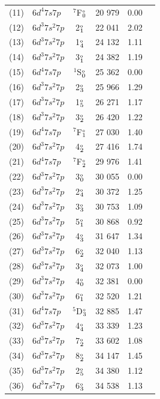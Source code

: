 \documentclass[10pt,a4paper, twoside]{report}
\begin{document}
\begin{table}[t]
\begin{tabular}{cl@{\hspace{0.5cm}}c@{\hspace{0.5cm}}r@{\hspace{0.5cm}}r@{\hspace{1cm}}l}
(11) &  $6d^4 7s 7p$  &  $^7$F$_0^{\rm_o}$   & 20 979 & 0.00  \\  
(12) &  $6d^3 7s^2 7p$  & 2$_1^{\rm_o}$     & 22 041 & 2.02   \\  
 (13) &  $6d^3 7s^2 7p$  &  1$_4^{\rm_o}$   & 24 132 & 1.11  \\ 
(14) &  $6d^3 7s^2 7p$  & 3$_1^{\rm_o}$    & 24 382 & 1.19  \\  
(15) &  $6d^4 7s 7p$  &  $^1$S$_0^{\rm_o}$   & 25 362 & 0.00 \\  
 (16) &  $6d^3 7s^2 7p$  & 2$_3^{\rm_o}$  & 25 966 & 1.29   \\  
 (17) &  $6d^3 7s^2 7p$  &  1$_{5}^{\rm_o}$   & 26 271 & 1.17  \\ 
(18) &   $6d^3 7s^2 7p$  & 3$_2^{\rm_o}$     & 26 420 & 1.22  \\
(19) &  $6d^4 7s 7p$  &  $^7$F$_1^{\rm_o}$  & 27 030 & 1.40  \\ 
(20) & $6d^3 7s^2 7p$  & 4$_2^{\rm_o}$   & 27 416 & 1.74  \\ 
(21) & $6d^4 7s  7p $  &  $^7$F$_2^{\rm_o}$   & 29 976 & 1.41   \\ 
(22) & $6d^3 7s^2 7p$  &  3$_0^{\rm_o}$ & 30 055 & 0.00 \\
(23) & $6d^3 7s^2 7p$  &  2$_4^{\rm_o}$ & 30 372 & 1.25 \\
(24) & $6d^3 7s^2 7p$ & 3$_3^{\rm_o}$  & 30 753 & 1.09 \\
(25) & $6d^3 7s^2 7p$  & 5$_1^{\rm_o}$  & 30 868 & 0.92 \\
(26) & $6d^3 7s^2 7p$ & 4$_3^{\rm_o}$ & 31 647 & 1.34  \\
(27) & $6d^3 7s^2 7p$  & 6$_2^{\rm_o}$  & 32 040 & 1.13 \\
(28) & $6d^3 7s^2 7p$  &  3$_4^{\rm_o}$ & 32 073 & 1.00  \\
(29) & $6d^3 7s^2 7p$ &  4$_0^{\rm_o}$ & 32 381 & 0.00 \\
(30) & $6d^3 7s^2 7p$ &  6$_1^{\rm_o}$  & 32 520 & 1.21  \\
(31) & $6d^4 7s  7p $  &  $^5$D$_3^{\rm_o}$ & 32 885 & 1.47  \\
(32) & $6d^3 7s^2 7p$  &  4$_4^{\rm_o}$ & 33 339 & 1.23  \\
(33) & $6d^3 7s^2 7p$  & 7$_2^{\rm_o}$  & 33 602 & 1.08 \\
(34) & $6d^3 7s^2 7p$  & 8$_2^{\rm_o}$  & 34 147 & 1.45 \\
(35) & $6d^3 7s^2 7p$  &  2$_{5}^{\rm_o}$ & 34 380 & 1.12  \\  
(36) & $6d^3 7s^2 7p$  & 6$_3^{\rm_o}$  & 34 538 & 1.13  \\

\end{tabular}
\end{table}
\end{document}
